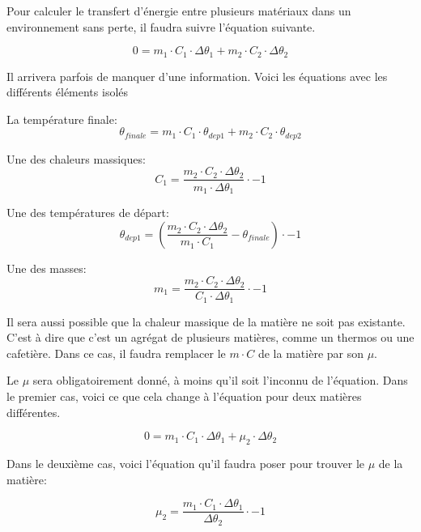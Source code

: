\documentclass{article}
\begin{document}
Pour calculer le transfert d'énergie entre plusieurs matériaux dans un environnement sans perte, il faudra suivre l'équation suivante.

\begin{equation}
	0 = m_1 \cdot C_1 \cdot \Delta\theta_1 + m_2 \cdot C_2 \cdot \Delta\theta_2
\end{equation}

Il arrivera parfois de manquer d'une information. Voici les équations avec les différents éléments isolés

La température finale:
\begin{equation}
	\theta_{finale} = m_1 \cdot C_1 \cdot \theta_{dep1} + m_2 \cdot C_2 \cdot \theta_{dep2}
\end{equation}

Une des chaleurs massiques:
\begin{equation}
	C_1 = \frac{m_2 \cdot C_2 \cdot \Delta\theta_2}{m_1 \cdot \Delta\theta_1} \cdot -1
\end{equation}

Une des températures de départ:
\begin{equation}
	\theta_{dep1} = (\frac{m_2 \cdot C_2 \cdot \Delta\theta_2}{m_1 \cdot C_1} - \theta_{finale}) \cdot -1
\end{equation}

Une des masses:
\begin{equation}
	m_1 = \frac{m_2 \cdot C_2 \cdot \Delta\theta_2}{C_1 \cdot \Delta\theta_1} \cdot -1
\end{equation}

Il sera aussi possible que la chaleur massique de la matière ne soit pas existante. C'est à dire que c'est un agrégat de plusieurs matières, comme un thermos ou une cafetière. Dans ce cas, il faudra remplacer le $m \cdot C$ de la matière par son $\mu$.

Le $\mu$ sera obligatoirement donné, à moins qu'il soit l'inconnu de l'équation. Dans le premier cas, voici ce que cela change à l'équation pour deux matières différentes.

\begin{equation}
	0 = m_1 \cdot C_1 \cdot \Delta\theta_1 + \mu_2 \cdot \Delta\theta_2
\end{equation}

Dans le deuxième cas, voici l'équation qu'il faudra poser pour trouver le $\mu$ de la matière:

\begin{equation}
	\mu_2 = \frac{m_1 \cdot C_1 \cdot \Delta\theta_1}{\Delta\theta_2} \cdot -1
\end{equation}
\end{document}
